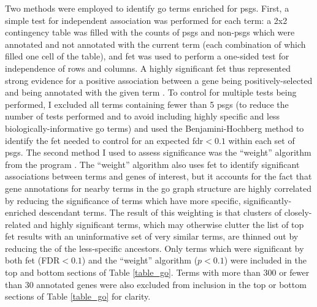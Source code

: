 Two methods were employed to identify \ac{go} terms enriched for
\acp{psg}. First, a simple test for independent association was
performed for each term: a 2x2 contingency table was filled with the
counts of \acp{psg} and non-\acp{psg} which were annotated and not
annotated with the current term (each combination of which filled one
cell of the table), and \ac{fet} was used to perform a one-sided test
for independence of rows and columns. A highly significant \ac{fet}
\pv thus represented strong evidence for a positive association
between a gene being positively-selected and being annotated with the
given term \citep{Rivals2007}. To control for multiple tests being
performed, I excluded all terms containing fewer than 5 \acp{psg} (to
reduce the number of tests performed and to avoid including highly
specific and less biologically-informative \ac{go} terms) and used the
Benjamini-Hochberg method to identify the \ac{fet} \pv needed to
control for an expected \ac{fdr}$<0.1$ within each set of
\acp{psg}. The second method I used to assess significance was the
``weight'' algorithm from the \topgo program
\citep{Alexa2006a}. The ``weight'' algorithm also uses \ac{fet}
to identify significant associations between terms and genes of
interest, but it accounts for the fact that gene annotations for
nearby terms in the \ac{go} graph structure are highly correlated by
reducing the significance of terms which have more specific,
significantly-enriched descendant terms. The result of this weighting
is that clusters of closely-related and highly significant terms,
which may otherwise clutter the list of top \ac{fet} results with an
uninformative set of very similar terms, are thinned out by reducing
the \pvs of the less-specific ancestors. Only terms which were
significant by both \ac{fet} (FDR$<0.1$) and the ``weight''
algorithm ($p<0.1$) were included in the top and bottom sections of
Table \ref{table_go}. Terms with more than 300 or fewer than 30
annotated genes were also excluded from inclusion in the top or bottom
sections of Table \ref{table_go} for clarity.

